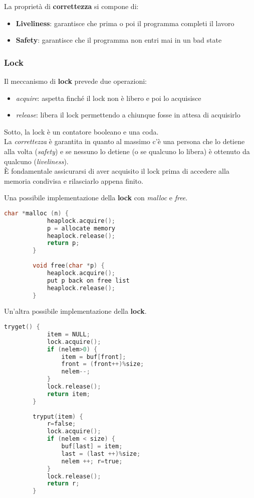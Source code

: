 \begin{definition}[Correctness]
	La proprietà di \textbf{correttezza} si compone di:
	\begin{itemize}
		\item \textbf{Liveliness}: garantisce che prima o poi il programma completi il lavoro
		\item \textbf{Safety}: garantisce che il programma non entri mai in un bad state
	\end{itemize}
\end{definition}

\subsubsection{Lock}
Il meccanismo di \textbf{lock} prevede due operazioni:
\begin{itemize}
	\item \textit{acquire}: aspetta finché il lock non è libero e poi lo acquisisce
	\item \textit{release}: libera il lock permettendo a chiunque fosse in attesa di acquisirlo
\end{itemize}
Sotto, la lock è un contatore booleano e una coda.\\
La \textit{correttezza} è garantita in quanto al massimo c'è una persona che lo detiene alla volta (\textit{safety}) e se nessuno lo detiene (o se qualcuno lo libera) è ottenuto da qualcuno (\textit{liveliness}).\\
È fondamentale assicurarsi di aver acquisito il lock prima di accedere alla memoria condivisa e rilasciarlo appena finito.

\begin{example}
	Una possibile implementazione della \textbf{lock} con \textit{malloc} e \textit{free}.
	\begin{lstlisting}[language=C]
		char *malloc (n) {
			heaplock.acquire();
			p = allocate memory
			heaplock.release();
			return p;
		}
		
		void free(char *p) {
			heaplock.acquire();
			put p back on free list
			heaplock.release();
		}
	\end{lstlisting}
\end{example}

\begin{example}
	Un'altra possibile implementazione della \textbf{lock}.
	\begin{lstlisting}[language=C]
		tryget() {
			item = NULL;
			lock.acquire();
			if (nelem>0) {
				item = buf[front];
				front = (front++)%size;
				nelem--;
			}
			lock.release();
			return item;
		}
		
		tryput(item) {
			r=false;
			lock.acquire();
			if (nelem < size) {
				buf[last] = item;
				last = (last ++)%size;
				nelem ++; r=true;
			}
			lock.release();
			return r;
		}
	\end{lstlisting}
\end{example}

